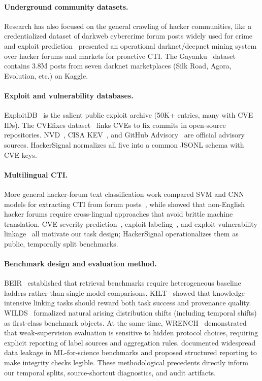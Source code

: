 \documentclass{article}
\begin{document}
\paragraph{Underground community datasets.} Research has also focused on the general crawling of hacker communities, like a credentialized dataset of darkweb cybercrime forum posts widely used for crime and exploit prediction~\citep{crimebb2018} \citet{nunes2016darknet} presented an operational darknet/deepnet mining system over hacker forums and markets for proactive CTI. The Gayanku~\citep{gayanku2020} dataset contains 3.8M posts from seven darknet marketplaces (Silk Road, Agora, Evolution, etc.) on Kaggle.

\paragraph{Exploit and vulnerability databases.} ExploitDB~\citep{exploitdb} is the salient public exploit archive (50K+ entries, many with CVE IDs). The CVEfixes dataset~\citep{cvefixes2021} links CVEs to fix commits in open-source repositories. NVD~\citep{nvd}, CISA KEV~\citep{cisakev}, and GitHub Advisory~\citep{githubadvisory} are official advisory sources. HackerSignal normalizes all five into a common JSONL schema with CVE keys.

\paragraph{Multilingual CTI.} More general hacker-forum text classification work compared SVM and CNN models for extracting CTI from forum posts~\citep{deliu2017cti}, while \citet{ebrahimi2020crosslingual} showed that non-English hacker forums require cross-lingual approaches that avoid brittle machine translation. CVE severity prediction~\citep{severitypred2017}, exploit labeling~\citep{ampel2024misq}, and exploit-vulnerability linkage~\citep{samtani2022eva} all motivate our task design; HackerSignal operationalizes them as public, temporally split benchmarks.

\paragraph{Benchmark design and evaluation method.} BEIR~\citep{thakur2021beir} established that retrieval benchmarks require heterogeneous baseline ladders rather than single-model comparisons. KILT~\citep{petroni2021kilt} showed that knowledge-intensive linking tasks should reward both task success and provenance quality. WILDS~\citep{koh2021wilds} formalized natural arising distribution shifts (including temporal shifts) as first-class benchmark objects. At the same time, WRENCH~\citep{zhang2021wrench} demonstrated that weak-supervision evaluation is sensitive to hidden protocol choices, requiring explicit reporting of label sources and aggregation rules. \citet{kapoor2023leakage} documented widespread data leakage in ML-for-science benchmarks and proposed structured reporting to make integrity checks legible. These methodological precedents directly inform our temporal splits, source-shortcut diagnostics, and audit artifacts.
\end{document}
